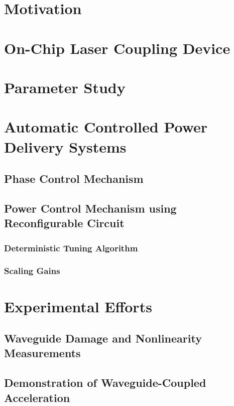 
\section{Motivation}

\section{On-Chip Laser Coupling Device}

\section{Parameter Study}

\section{Automatic Controlled Power Delivery Systems}

\subsection{Phase Control Mechanism}

\subsection{Power Control Mechanism using Reconfigurable Circuit}

\subsubsection{Deterministic Tuning Algorithm}

\subsubsection{Scaling Gains}

\section{Experimental Efforts}

\subsection{Waveguide Damage and Nonlinearity Measurements}

\subsection{Demonstration of Waveguide-Coupled Acceleration}
